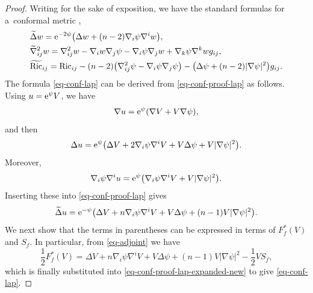 \documentclass[10pt,a4paper]{amsart}
\numberwithin{equation}{section}
\theoremstyle{definition}
\begin{document}
\begin{proof}
	Writing  for the sake of exposition, we have the standard formulas for a~conformal metric ,
	\begin{align}
		&\widetilde\Delta w
={\rm e}^{-2\psi}\bigl(\Delta w+(n-2) \nabla_i\psi \nabla^i w\bigr), \label{eq-conf-proof-lap}\\
&		\widetilde\nabla^2_{ij} w
=\nabla_{ij}^2 w-\nabla_iw \nabla_j\psi-\nabla_i\psi \nabla_jw+\nabla_k\psi \nabla^k w g_{ij}, \label{eq-conf-proof-hess}\\
& \widetilde{\mathrm{Ric}}_{ij}
=\mathrm{Ric}_{ij}-(n-2)\big(\nabla_{ij}^2\psi-\nabla_i\psi \nabla_j\psi\big)
-\big(\Delta\psi+(n-2)|\nabla\psi|^2\big)g_{ij}. \label{eq-conf-proof-ric}
	\end{align}
	The formula \eqref{eq-conf-lap} can be derived from \eqref{eq-conf-proof-lap} as follows. Using $u={\rm e}^{\psi}V$, we have
	\[
	\nabla u={\rm e}^{\psi}(\nabla V+V\nabla\psi),
	\]
	and then
	\[
	\Delta u
	={\rm e}^{\psi}\bigl(\Delta V+2\nabla_i\psi \nabla^i V+V\Delta\psi+V|\nabla\psi|^2\bigr).
	\]
	Moreover,
	\[
	\nabla_i\psi \nabla^i u
	={\rm e}^{\psi}\bigl(\nabla_i\psi \nabla^i V+V|\nabla\psi|^2\bigr).
	\]
	Inserting these into \eqref{eq-conf-proof-lap} gives
	\begin{equation}\label{eq-conf-proof-lap-expanded-new}
		\widetilde\Delta u
		={\rm e}^{-\psi}\bigl(\Delta V+n\nabla_i\psi \nabla^i V+V\Delta\psi+(n-1)V|\nabla\psi|^2\bigr).
	\end{equation}
	We next show that the terms in parentheses can be expressed in terms of $F_f^*(V)$ and $S_f$. In particular, from \eqref{eq-adjoint} we have
	\[
	\frac12 F_f^*(V)
	=\Delta V+n\nabla_i\psi \nabla^i V+V\Delta\psi+(n-1)V|\nabla\psi|^2-\frac12 V S_f,
	\]
	which is finally substituted into \eqref{eq-conf-proof-lap-expanded-new} to give \eqref{eq-conf-lap}.
	

\end{proof}
\end{document}
